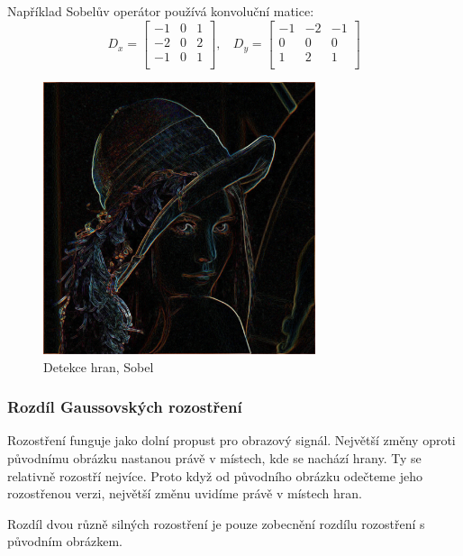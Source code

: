 \documentclass[11pt]{article}
\begin{document}
Například Sobelův operátor používá konvoluční matice: \\
$$
D_x = 
\left[
\begin{array}{ccc}
-1 & 0 & 1 \\
-2 & 0 & 2 \\
-1 & 0 & 1 \\
\end{array}
\right]
,~~~~
D_y = 
\left[
\begin{array}{ccc}
-1 & -2 & -1 \\
0 & 0 & 0 \\
1 & 2 & 1 \\
\end{array}
\right]
$$

\begin{figure}[ht!]
\centering
	\includegraphics[width=8cm]{sobel.png}
	\caption{Detekce hran, Sobel}
\end{figure}

\subsubsection{Rozdíl Gaussovských rozostření}
Rozostření funguje jako dolní propust pro obrazový signál. Největší změny
oproti původnímu obrázku nastanou právě v místech, kde se nachází hrany. Ty se
relativně rozostří nejvíce. Proto když od původního obrázku odečteme jeho
rozostřenou verzi, největší změnu uvidíme právě v místech hran.

Rozdíl dvou různě silných rozostření je pouze zobecnění rozdílu rozostření s
původním obrázkem.
\end{document}
